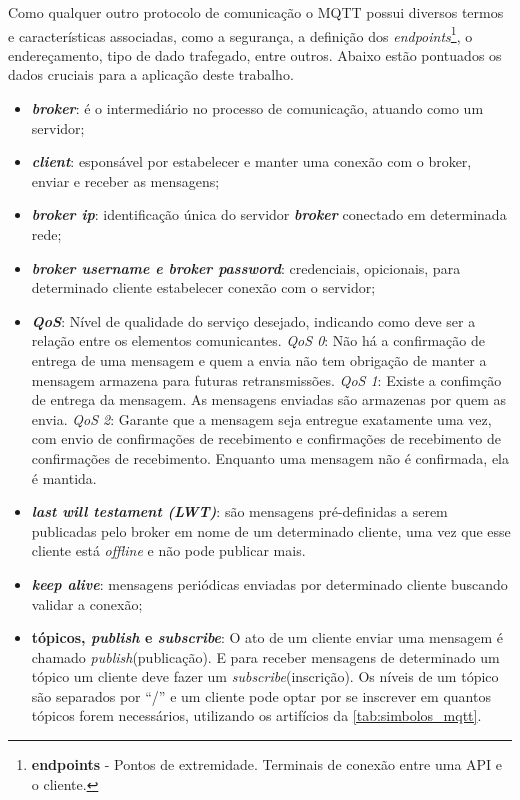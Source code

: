 Como qualquer outro protocolo de comunicação o MQTT possui diversos termos e características associadas, como a segurança, a definição dos \textit{endpoints}\footnote{\textbf{endpoints} - Pontos de extremidade. Terminais de conexão entre uma API e o cliente.}, o endereçamento, tipo de dado trafegado, entre outros. Abaixo estão pontuados os dados cruciais para a aplicação deste trabalho.

\begin{itemize}
	\item \textbf{\textit{broker}}: é o intermediário no processo de comunicação, atuando como um servidor;
	\item \textbf{\textit{client}}: esponsável por estabelecer e manter uma conexão com o broker, enviar e receber as mensagens;
	\item \textit{\textbf{broker ip}}: identificação única do servidor \textit{\textbf{broker}} conectado em determinada rede;
	\item \textbf{\textit{broker username e broker password}}: credenciais, opicionais, para determinado cliente estabelecer conexão com o servidor; 
	\item  \textit{\textbf{QoS}}: Nível de qualidade do serviço desejado, indicando como deve ser a relação entre os elementos comunicantes. \textit{QoS 0}: Não há a confirmação de entrega de uma mensagem e quem a envia não tem obrigação de manter a mensagem armazena para futuras retransmissões. \textit{QoS 1}: Existe a confimção de entrega da mensagem. As mensagens enviadas são armazenas por quem as envia. \textit{QoS 2}: Garante que a mensagem seja entregue exatamente uma vez, com envio de confirmações de recebimento e confirmações de recebimento de confirmações de recebimento. Enquanto uma mensagem não é confirmada, ela é mantida.\cite{fabiobrandao}
	\item \textbf{\textit{last will testament (LWT)}}: são mensagens pré-definidas a serem publicadas pelo broker em nome de um determinado cliente, uma vez que esse cliente está \textit{offline} e não pode publicar mais.
	\item \textbf{\textit{keep alive}}: mensagens periódicas enviadas por determinado cliente buscando validar a conexão;
	\item \textbf{tópicos, \textit{publish} e \textit{subscribe}}: O ato de um cliente enviar uma mensagem é chamado \textit{publish}(publicação). E para receber mensagens de determinado um tópico um cliente deve fazer um \textit{subscribe}(inscrição). Os níveis de um tópico são separados por “/” e um cliente pode optar por se inscrever em quantos tópicos forem necessários, utilizando os artifícios da \autoref{tab:simbolos_mqtt}.
	
\end{itemize}

